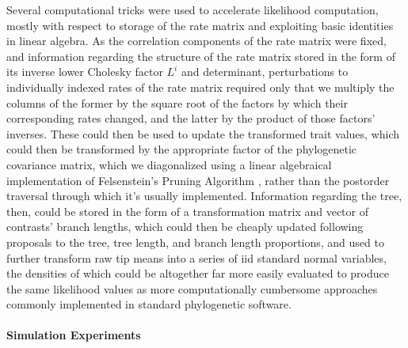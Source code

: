 \documentclass[12pt, twocolumn, twoside]{article}
\begin{document}
Several computational tricks were used to accelerate likelihood computation, mostly with respect to storage of the rate matrix and exploiting basic identities in linear algebra. As the correlation components of the rate matrix were fixed, and information regarding the structure of the rate matrix stored in the form of its inverse lower Cholesky factor $L^i$ and determinant, perturbations to individually indexed rates of the rate matrix required only that we multiply the columns of the former by the square root of the factors by which their corresponding rates changed, and the latter by the product of those factors' inverses. These could then be used to update the transformed trait values, which could then be transformed by the appropriate factor of the phylogenetic covariance matrix, which we diagonalized using a linear algebraical implementation of Felsenstein's Pruning Algorithm \citep{felsensteinMaximumlikelihoodEstimationEvolutionary1973b}, rather than the postorder traversal through which it's usually implemented. Information regarding the tree, then, could be stored in the form of a transformation matrix and vector of contrasts' branch lengths, which could then be cheaply updated following proposals to the tree, tree length, and branch length proportions, and used to further transform raw tip means into a series of iid standard normal variables, the densities of which could be altogether far more easily evaluated to produce the same likelihood values as more computationally cumbersome approaches commonly implemented in standard phylogenetic software.

\paragraph{Simulation Experiments}
\end{document}
